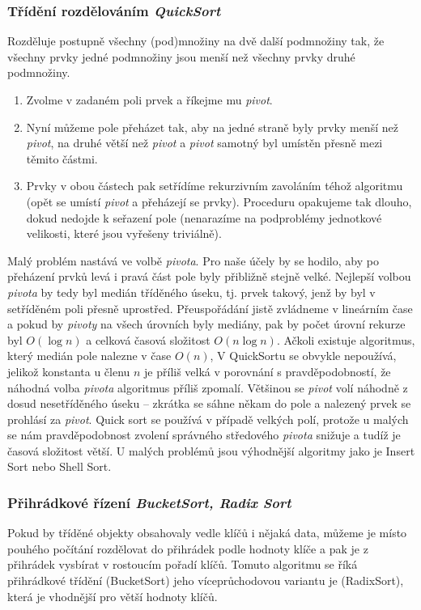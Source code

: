 \subsubsection{Třídění rozdělováním \textit{QuickSort}}
Rozděluje postupně všechny (pod)množiny na dvě další podmnožiny tak, že všechny prvky jedné podmnožiny jsou menší než všechny prvky druhé podmnožiny.
\begin{enumerate}
\item Zvolme v zadaném poli prvek a říkejme mu \textit{pivot}.
\item Nyní můžeme pole přeházet tak, aby na jedné straně byly prvky menší než \textit{pivot}, na druhé větší než \textit{pivot} a \textit{pivot} samotný byl umístěn přesně mezi těmito částmi.
\item Prvky v obou částech pak setřídíme rekurzivním zavoláním téhož algoritmu (opět se umístí \textit{pivot} a přeházejí se prvky). Proceduru opakujeme tak dlouho, dokud nedojde k seřazení pole (nenarazíme na podproblémy jednotkové velikosti, které jsou vyřešeny triviálně).
\end{enumerate}
Malý problém nastává ve volbě \textit{pivota}. Pro naše účely by se hodilo, aby po přeházení prvků levá i pravá část pole byly přibližně stejně velké. Nejlepší volbou \textit{pivota} by tedy byl medián tříděného úseku, tj. prvek takový, jenž by byl v setříděném poli přesně uprostřed. Přeuspořádání jistě zvládneme v lineárním čase a pokud by \textit{pivoty} na všech úrovních byly mediány, pak by počet úrovní rekurze byl $O(\log n)$ a celková časová složitost $O(n \log n)$. Ačkoli existuje algoritmus, který medián pole nalezne v čase $O(n)$, V QuickSortu se obvykle nepoužívá, jelikož konstanta u členu $n$ je příliš velká v porovnání s pravděpodobností, že náhodná volba \textit{pivota} algoritmus příliš zpomalí. Většinou se \textit{pivot} volí náhodně z dosud nesetříděného úseku – zkrátka se sáhne někam do pole a nalezený prvek se prohlásí za \textit{pivot}. Quick sort se používá v případě velkých polí, protože u malých se nám pravděpodobnost zvolení správného středového \textit{pivota} snižuje a tudíž je časová složitost větší. U malých problémů jsou výhodnější algoritmy jako je Insert Sort nebo Shell Sort.

\subsubsection{Přihrádkové řízení \textit{BucketSort, Radix Sort}}
Pokud by tříděné objekty obsahovaly vedle klíčů i nějaká data, můžeme je místo pouhého počítání rozdělovat do přihrádek podle hodnoty klíče a pak je z přihrádek vysbírat v rostoucím pořadí klíčů. Tomuto algoritmu se říká přihrádkové třídění (BucketSort) jeho víceprůchodovou variantu je (RadixSort), která je vhodnější pro větší hodnoty klíčů.

